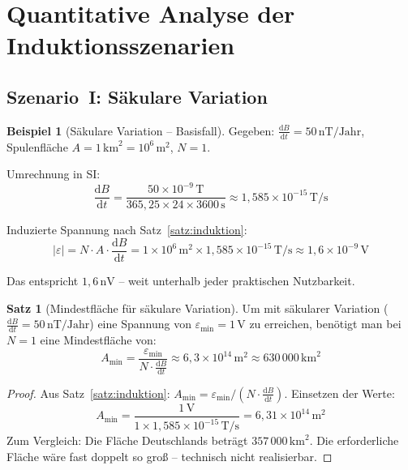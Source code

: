 ﻿\documentclass[a4paper,12pt]{article}
\theoremstyle{definition}
\newtheorem{beispiel}{Beispiel}
\newtheorem{satz}{Satz}
\begin{document}
\section{Quantitative Analyse der Induktionsszenarien}

\subsection{Szenario~I: S\"akulare Variation}

\begin{beispiel}[S\"akulare Variation -- Basisfall]
\label{bsp:sekular}
    Gegeben: $\tfrac{\mathrm{d}B}{\mathrm{d}t} = 50\,\mathrm{nT/Jahr}$,
    Spulenfläche $A = 1\,\mathrm{km}^2 = 10^6\,\mathrm{m}^2$, $N = 1$.

    Umrechnung in SI:
    \[
        \frac{\mathrm{d}B}{\mathrm{d}t}
        = \frac{50 \times 10^{-9}\,\mathrm{T}}{365{,}25 \times 24 \times 3600\,\mathrm{s}}
        \approx 1{,}585 \times 10^{-15}\,\mathrm{T/s}
    \]

    Induzierte Spannung nach Satz~\ref{satz:induktion}:
    \[
        |\varepsilon| = N \cdot A \cdot \frac{\mathrm{d}B}{\mathrm{d}t}
        = 1 \times 10^6\,\mathrm{m}^2 \times 1{,}585 \times 10^{-15}\,\mathrm{T/s}
        \approx 1{,}6 \times 10^{-9}\,\mathrm{V}
    \]

    Das entspricht $1{,}6\,\mathrm{nV}$ -- weit unterhalb jeder praktischen Nutzbarkeit.
\end{beispiel}

\begin{satz}[Mindestfläche für s\"akulare Variation]
\label{satz:minflaeche_sekular}
    Um mit s\"akularer Variation ($\tfrac{\mathrm{d}B}{\mathrm{d}t} = 50\,\mathrm{nT/Jahr}$)
    eine Spannung von $\varepsilon_{\min} = 1\,\mathrm{V}$ zu erreichen,
    ben\"otigt man bei $N = 1$ eine Mindestfl\"ache von:
    \[
        A_{\min} = \frac{\varepsilon_{\min}}{N \cdot \tfrac{\mathrm{d}B}{\mathrm{d}t}}
        \approx 6{,}3 \times 10^{14}\,\mathrm{m}^2 \approx 630\,000\,\mathrm{km}^2
    \]
\end{satz}

\begin{proof}
    Aus Satz~\ref{satz:induktion}: $A_{\min} = \varepsilon_{\min} / (N \cdot \tfrac{\mathrm{d}B}{\mathrm{d}t})$.
    Einsetzen der Werte:
    \[
        A_{\min} = \frac{1\,\mathrm{V}}{1 \times 1{,}585 \times 10^{-15}\,\mathrm{T/s}}
        = 6{,}31 \times 10^{14}\,\mathrm{m}^2
    \]
    Zum Vergleich: Die Fl\"ache Deutschlands betr\"agt $357\,000\,\mathrm{km}^2$.
    Die erforderliche Fl\"ache w\"are fast doppelt so gro{\ss} -- technisch nicht realisierbar.
\end{proof}
\end{document}
